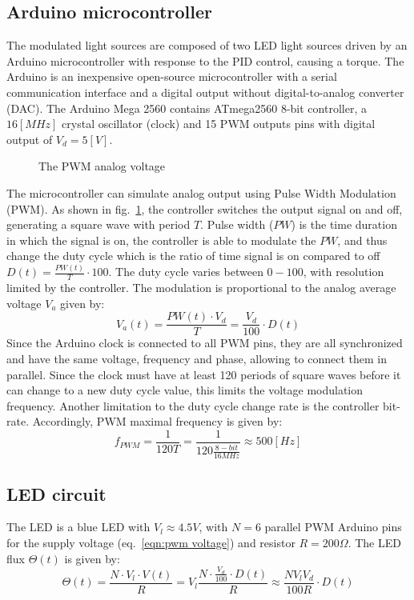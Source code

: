 \documentclass[\main/master.tex]{subfiles}
\begin{document}
\subsection{Arduino microcontroller}
The modulated light sources are composed of two LED light sources driven by an Arduino microcontroller with response to the PID control, causing a torque. The Arduino is an inexpensive open-source microcontroller with a serial communication interface and a digital output without digital-to-analog converter (DAC). The Arduino Mega 2560 contains ATmega2560 8-bit controller, a $16 [MHz]$ crystal oscillator (clock) and 15 PWM outputs pins with digital output of $V_d = 5[V]$.
\begin{figure}[htbp]
	\centering
	\caption[The PWM analog voltage]{The PWM analog voltage}
	\label{fig:duty_cycle}
\end{figure}
\FloatBarrier
\par\noindent
The microcontroller can simulate analog output using Pulse Width Modulation (PWM). As shown in fig.~\ref{fig:duty_cycle}, the controller switches the output signal on and off, generating a square wave with period $T$. Pulse width ($PW$) is the time duration in which the signal is on, the controller is able to modulate the $PW$, and thus change the duty cycle which is the ratio of time signal is on compared to off $D(t) = \frac{PW(t)}{T}\cdot 100$. The duty cycle varies between $0-100$, with resolution limited by the controller. The modulation is proportional to the analog average voltage $V_a$ given by: 
\begin{equation}
V_a(t) = \frac{ PW(t)\cdot V_d}{ T}  = \frac{V_d}{100}\cdot D(t)   \label{eqn:pwm voltage}
\end{equation}
Since the Arduino clock is connected to all PWM pins, they are all synchronized and have the same voltage, frequency and phase, allowing to connect them in parallel. Since the clock must have at least 120 periods of square waves before it can change to a new duty cycle value, this limits the voltage modulation frequency. Another limitation to the duty cycle change rate is the controller bit-rate. Accordingly, PWM maximal frequency is given by:
\begin{equation}
f_{PWM} = \frac{1 }{120T}= \frac{1 }{120 \frac{8-bit }{16MHz}}  \approx 500[Hz]	    \label{eqn:pwm frequency}
\end{equation}

\subsection{LED circuit}
The LED is a blue LED with $V_l\approx 4.5V$, with $N=6$ parallel PWM Arduino pins for the supply voltage (eq.~\ref{eqn:pwm voltage}) and resistor $R = 200\Omega$. The LED flux $\Theta(t)$ is given by:
\begin{equation}
\Theta(t) = \frac{N\cdot V_l\cdot V(t)}{R} = V_l\frac{N\cdot\frac{V_d}{100}\cdot D(t)}{R} \approx \frac{N V_l V_d}{100R}\cdot D(t) \label{eqn:led power}
\end{equation}
\par\noindent
\end{document}

